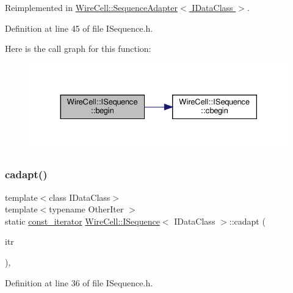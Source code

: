 Reimplemented in \hyperlink{class_wire_cell_1_1_sequence_adapter_ab9d7082a27f17937871ef9ff97e1b8ad}{Wire\+Cell\+::\+Sequence\+Adapter$<$ I\+Data\+Class $>$}.



Definition at line 45 of file I\+Sequence.\+h.

Here is the call graph for this function\+:
\nopagebreak
\begin{figure}[H]
\begin{center}
\leavevmode
\includegraphics[width=330pt]{class_wire_cell_1_1_i_sequence_a03153c2cdc4d34c0feca9b214d4ed2a8_cgraph}
\end{center}
\end{figure}
\mbox{\label{class_wire_cell_1_1_i_sequence_a14e5cb0b4dbac2c6aa82ee4734ce6b90}} 
\subsubsection{\texorpdfstring{cadapt()}{cadapt()}}
{\footnotesize\ttfamily template$<$class I\+Data\+Class$>$ \\
template$<$typename Other\+Iter $>$ \\
static \hyperlink{class_wire_cell_1_1_i_sequence_a70e983c18db65df4337838592fa9fd9d}{const\+\_\+iterator} \hyperlink{class_wire_cell_1_1_i_sequence}{Wire\+Cell\+::\+I\+Sequence}$<$ I\+Data\+Class $>$\+::cadapt (\begin{DoxyParamCaption}\item[{const Other\+Iter \&}]{itr }\end{DoxyParamCaption})\hspace{0.3cm}{\ttfamily [inline]}, {\ttfamily [static]}}



Definition at line 36 of file I\+Sequence.\+h.

